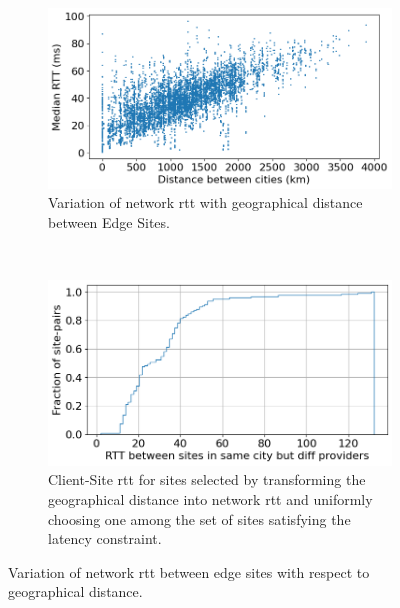 \begin{figure}[t!]
    \centering
    \begin{subfigure}[t]{0.45\textwidth}
        \centering
        \includegraphics[width=\textwidth]{figures/mechanisms/nw_proximity/shortest-rtt-vs-dist.png}
        \caption{Variation of network \gls{rtt} with geographical distance between Edge Sites.}
        \label{fig:geodist_vs_rtt}
    \end{subfigure}%
    ~ 
    \begin{subfigure}[t]{0.45\textwidth}
        \centering
        \includegraphics[width=\textwidth]{figures/mechanisms/nw_proximity/same_city_diff_provider_rtts.png}
        \caption{Client-Site \gls{rtt} for sites selected by transforming the geographical distance into network \gls{rtt} and uniformly choosing one among the set of sites satisfying the latency constraint.}
        \label{fig:same_city_diff_prov}
    \end{subfigure}
    \caption{Variation of network \gls{rtt} between edge sites with respect to geographical distance.}
\end{figure}

